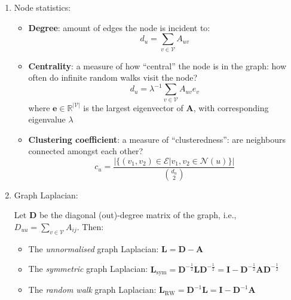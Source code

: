 \documentclass{article}
\begin{document}
\begin{enumerate}
	\item Node statistics:
	\begin{itemize}[topsep=0pt]
		\item \textbf{Degree}: amount of edges the node is incident to:
		$$d_u=\sum_{v\in\mathcal{V}}A_{uv}$$
		\item \textbf{Centrality}: a measure of how ``central'' the node is in the graph: how often do infinite random walks visit the node?
		$$d_u=\lambda^{-1}\sum_{v\in\mathcal{V}}A_{uv}e_v$$
		where $\mathbf{e}\in\mathbb{R}^{|\mathcal{V}|}$ is the largest eigenvector of $\mathbf{A}$, with corresponding eigenvalue $\lambda$
		\item \textbf{Clustering coefficient}: a measure of ``clusteredness'': are neighbours connected amongst each other?
		$$c_u=\frac{\left|\big\{(v_1, v_2)\in\mathcal{E}\big|v_1, v_2\in\mathcal{N}(u)\big\}\right|}{{d_u \choose 2}}$$
	\end{itemize}


	\item Graph Laplacian:
	
	Let $\mathbf{D}$ be the diagonal (out)-degree matrix of the graph, i.e., $D_{uu}=\sum_{v\in\mathcal{V}}A_{ij}$. Then:
	\begin{itemize}[topsep=0pt]
		\item The \textit{unnormalised} graph Laplacian: $\mathbf{L}=\mathbf{D}-\mathbf{A}$
		\item The \textit{symmetric} graph Laplacian: $\mathbf{L}_\text{sym}=\mathbf{D}^{-\frac{1}{2}}\mathbf{L}\mathbf{D}^{-\frac{1}{2}}=\mathbf{I}-\mathbf{D}^{-\frac{1}{2}}\mathbf{A}\mathbf{D}^{-\frac{1}{2}}$
		\item The \textit{random walk} graph Laplacian: $\mathbf{L}_\text{RW}=\mathbf{D}^{-1}\mathbf{L}=\mathbf{I}-\mathbf{D}^{-1}\mathbf{A}$
	\end{itemize}
	

\end{enumerate}
\end{document}
